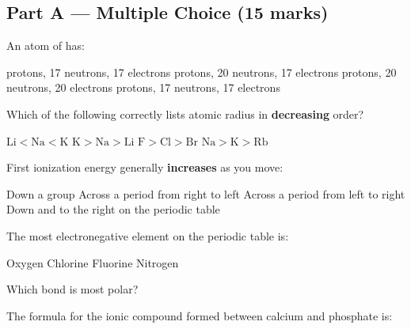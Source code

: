\documentclass[addpoints]{exam}
\begin{document}
\newpage
\begin{questions}

\section*{Part A --- Multiple Choice (15 marks)}
\vspace{5mm}

\question[1] An atom of  has:
\begin{choices}
     protons, 17 neutrons, 17 electrons
     protons, 20 neutrons, 17 electrons
     protons, 20 neutrons, 20 electrons
     protons, 17 neutrons, 17 electrons
\end{choices}

\question[1] Which of the following correctly lists atomic radius in \textbf{decreasing} order?
\begin{choices}
    \choice $\text{Li} < \text{Na} < \text{K}$
    \correctchoice $\text{K} > \text{Na} > \text{Li}$
    \choice $\text{F} > \text{Cl} > \text{Br}$
    \choice $\text{Na} > \text{K} > \text{Rb}$
\end{choices}

\question[1] First ionization energy generally \textbf{increases} as you move:
\begin{choices}
    \choice Down a group
    \choice Across a period from right to left
    \correctchoice Across a period from left to right
    \choice Down and to the right on the periodic table
\end{choices}

\question[1] The most electronegative element on the periodic table is:
\begin{choices}
    \choice Oxygen
    \choice Chlorine
    \correctchoice Fluorine
    \choice Nitrogen
\end{choices}

\question[1] Which bond is most polar?
\begin{choices}
    \choice {}
    \choice {}
    \correctchoice {}
    \choice {}
\end{choices}

\question[1] The formula for the ionic compound formed between calcium and phosphate is:
\begin{choices}
    \choice {}
    \choice {}
    \correctchoice {}
    \choice {}
\end{choices}


\end{questions}
\end{document}
